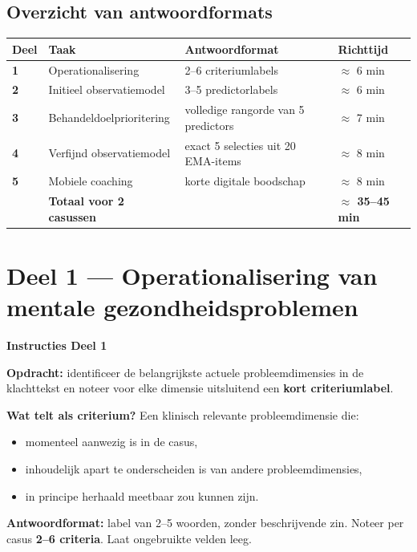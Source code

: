 \documentclass[11pt,a4paper]{article}
\begin{document}
\subsection{Overzicht van antwoordformats}

\begin{center}
\small
\begin{tabular}{@{}>{\bfseries}p{}p{}p{}p{}@{}}
\toprule
Deel & Taak & Antwoordformat & Richttijd \\
\midrule
1 & Operationalisering & 2--6 criteriumlabels & $\approx$ 6 min \\
2 & Initieel observatiemodel & 3--5 predictorlabels & $\approx$ 6 min \\
3 & Behandeldoelprioritering & volledige rangorde van 5 predictors & $\approx$ 7 min \\
4 & Verfijnd observatiemodel & exact 5 selecties uit 20 EMA-items & $\approx$ 8 min \\
5 & Mobiele coaching & korte digitale boodschap & $\approx$ 8 min \\
\midrule
 & \textbf{Totaal voor 2 casussen} & & \textbf{$\approx$ 35--45 min} \\
\bottomrule
\end{tabular}
\end{center}

\newpage


\section{Deel 1 --- Operationalisering van mentale gezondheidsproblemen}

\begin{tcolorbox}[colback=blue!3,colframe=PrimaryBlue,arc=2.5mm,boxrule=0.9pt,
  left=10pt,right=10pt,top=9pt,bottom=9pt]
\textbf{\color{PrimaryBlue}Instructies Deel 1}

\smallskip\small
\textbf{Opdracht:} identificeer de belangrijkste actuele probleemdimensies in de klachttekst en noteer
voor elke dimensie uitsluitend een \textbf{kort criteriumlabel}.

\textbf{Wat telt als criterium?}
Een klinisch relevante probleemdimensie die:
\begin{itemize}[topsep=2pt,itemsep=1pt]
\item momenteel aanwezig is in de casus,
\item inhoudelijk apart te onderscheiden is van andere probleemdimensies,
\item in principe herhaald meetbaar zou kunnen zijn.
\end{itemize}

\textbf{Antwoordformat:} label van 2--5 woorden, zonder beschrijvende zin.
Noteer per casus \textbf{2--6 criteria}. Laat ongebruikte velden leeg.
\end{tcolorbox}
\end{document}
